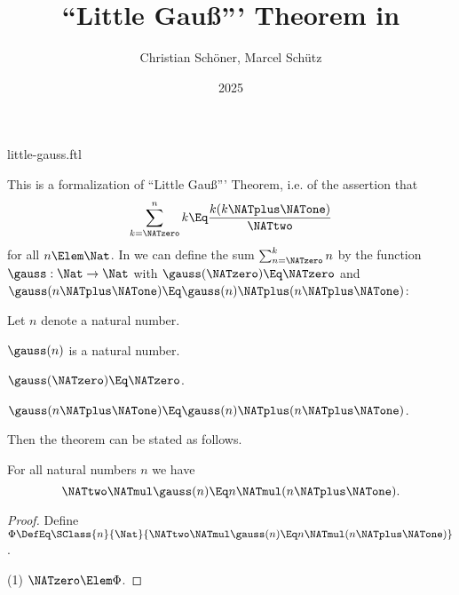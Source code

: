 \documentclass{stex}
\title{``Little Gauß''' Theorem in \Naproche}
\author{Christian Schöner, Marcel Schütz}
\date{2025}
\begin{document}
\begin{smodule}{little-gauss.ftl}
\maketitle



\noindent This is a formalization of ``Little Gauß''' Theorem, i.e. of
the assertion that
\[\sum_{k = \NATzero}^n k \Eq \frac{k(k \NATplus \NATone)}\NATtwo\]
for all $n \Elem \Nat$.
In \Naproche we can define the sum $\sum_{n = \NATzero}^k n$ by the function
$\gauss : \Nat \to \Nat$ with $\gauss(\NATzero) \Eq \NATzero$ and
$\gauss(n \NATplus \NATone) \Eq \gauss(n) \NATplus (n \NATplus \NATone)$:

\begin{forthel}
  Let $n$ denote a natural number.

  \begin{signature*}[for=gauss]
    $\gauss(n)$ is a natural number.
  \end{signature*}

  \begin{axiom*}
    $\gauss(\NATzero) \Eq \NATzero$.
  \end{axiom*}

  \begin{axiom*}
    $\gauss(n \NATplus \NATone) \Eq \gauss(n) \NATplus (n \NATplus \NATone)$.
  \end{axiom*}
\end{forthel}

\noindent Then the theorem can be stated as follows.

\begin{forthel}
  \begin{theorem*}[title=Little Gauß,name=Little Gauss]
    For all natural numbers $n$ we have
    \[\NATtwo \NATmul \gauss(n) \Eq n \NATmul (n \NATplus \NATone).\]
  \end{theorem*}
  \begin{proof}
    Define $\Phi \DefEq \SClass{n}{\Nat}{\NATtwo \NATmul \gauss(n) \Eq n \NATmul (n \NATplus \NATone)}$.
    
    (1) $\NATzero \Elem \Phi$.


\end{proof}
\end{forthel}
\end{smodule}
\end{document}
